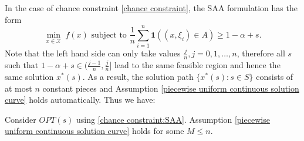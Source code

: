 \documentclass[mnsc,blindrev]{informs4} %
\begin{document}
In the case of chance constraint \eqref{chance constraint}, the SAA formulation has the form
\begin{equation}\label{chance constraint:SAA}
\min_{x\in\mathcal X}\ f(x)\text{\ \ subject to\ \ }\frac{1}{n}\sum_{i=1}^n\mathbf{1}((x,\xi_i)\in A)\geq 1-\alpha +s.
\end{equation}
Note that the left hand side can only take values $\frac{j}{n},j=0,1,\ldots,n$, therefore all $s$ such that $1-\alpha +s\in(\frac{j-1}{n},\frac{j}{n}]$ lead to the same feasible region and hence the same solution $x^*(s)$. As a result, the solution path $\{x^*(s):s\in S\}$ consists of at most $n$ constant pieces and Assumption \ref{piecewise uniform continuous solution curve} holds automatically. Thus we have:

\begin{theorem}
Consider $OPT(s)$ using \eqref{chance constraint:SAA}. Assumption \ref{piecewise uniform continuous solution curve} holds for some $M\leq n$.
\end{theorem}


\smallskip



\end{document}
